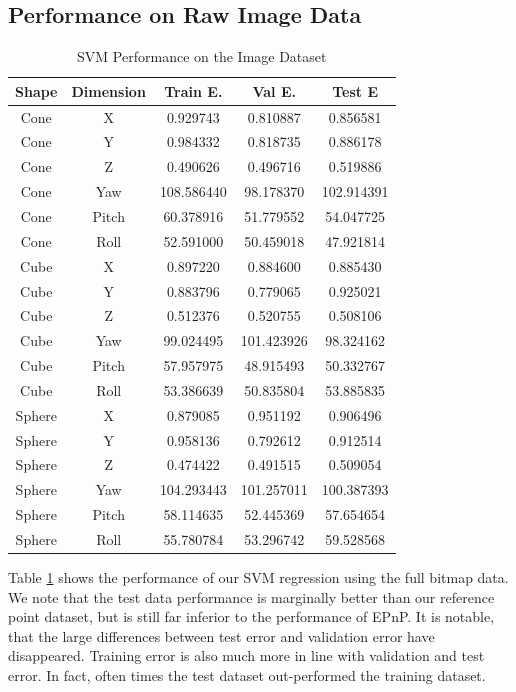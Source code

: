 \documentclass[journal]{IEEEtran}
\begin{document}
\subsection{Performance on Raw Image Data}

\begin{table}[h]
\caption{SVM Performance on the Image Dataset}
\label{SVM_Image}
\centering

\begin{tabular}{|c|c|c|c|c|}
\hline
Shape & Dimension & Train E. & Val E. & Test E\\
\hline
Cone & X & 0.929743 & 0.810887 & 0.856581\\
Cone & Y & 0.984332 & 0.818735 & 0.886178\\
Cone & Z & 0.490626 & 0.496716 & 0.519886\\
Cone & Yaw & 108.586440 & 98.178370 & 102.914391\\
Cone & Pitch & 60.378916 & 51.779552 & 54.047725\\
Cone & Roll & 52.591000 & 50.459018 & 47.921814\\
\hline
Cube & X & 0.897220 & 0.884600 & 0.885430\\
Cube & Y & 0.883796 & 0.779065 & 0.925021\\
Cube & Z & 0.512376 & 0.520755 & 0.508106\\
Cube & Yaw & 99.024495 & 101.423926 & 98.324162\\
Cube & Pitch & 57.957975 & 48.915493 & 50.332767\\
Cube & Roll & 53.386639 & 50.835804 & 53.885835\\
\hline
Sphere & X & 0.879085 & 0.951192 & 0.906496\\
Sphere & Y & 0.958136 & 0.792612 & 0.912514\\
Sphere & Z & 0.474422 & 0.491515 & 0.509054\\
Sphere & Yaw & 104.293443 & 101.257011 & 100.387393\\
Sphere & Pitch & 58.114635 & 52.445369 & 57.654654\\
Sphere & Roll & 55.780784 & 53.296742 & 59.528568\\
\hline
\end{tabular}

\end{table}

Table \ref{SVM_Image} shows the performance of our SVM regression using the full bitmap data. We note that the test data performance is marginally better than our reference point dataset, but is still far inferior to the performance of EPnP. It is notable, that the large differences between test error and validation error have disappeared. Training error is also much more in line with validation and test error. In fact, often times the test dataset out-performed the training dataset.
\end{document}
